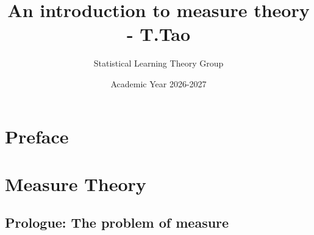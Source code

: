 \documentclass[12pt, oneside]{book}
\title{An introduction to measure theory - T.Tao}
\author{Statistical Learning Theory Group}
\date{Academic Year 2026-2027}
\numberwithin{equation}{chapter}
\begin{document}
\maketitle
\tableofcontents

\vspace{.25in}


\chapter*{Preface}



\chapter{Measure Theory}
\section{Prologue: The problem of measure}


















\end{document}
